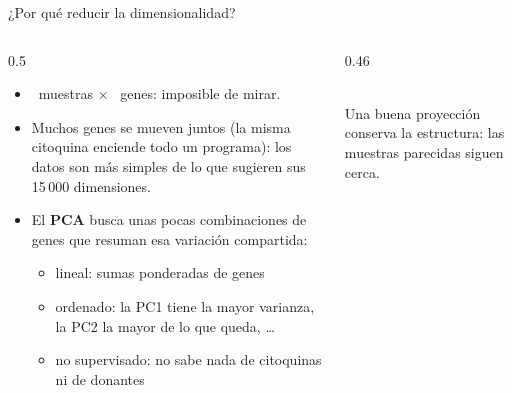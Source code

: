 \begin{frame}{¿Por qué reducir la dimensionalidad?}
  \begin{columns}[c]
    \begin{column}{0.5\linewidth}\small
      \begin{itemize}\setlength\itemsep{4pt}
        \item \numnsamples\ muestras $\times$ \numngenes\ genes: imposible de mirar.
        \item Muchos genes se mueven \alert{juntos} (la misma citoquina enciende todo un programa): los datos son más simples de lo que sugieren sus 15\,000 dimensiones.
        \item El \textbf{PCA} busca unas pocas \alert{combinaciones de genes} que resuman esa variación compartida:
        \begin{itemize}\footnotesize
          \item \alert{lineal}: sumas ponderadas de genes
          \item \alert{ordenado}: la PC1 tiene la mayor varianza, la PC2 la mayor de lo que queda, \ldots
          \item \alert{no supervisado}: no sabe nada de citoquinas ni de donantes
        \end{itemize}
      \end{itemize}
    \end{column}
    \begin{column}{0.46\linewidth}
      \centering
      \\[4pt]
      \footnotesize Una buena proyección conserva la \alert{estructura}: las muestras parecidas siguen cerca.
    \end{column}
  \end{columns}
\end{frame}

